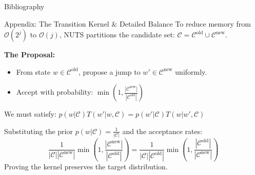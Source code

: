 \documentclass{beamer}
\begin{document}
\begin{frame}{Bibliography}
    \printbibliography[heading=none]
\end{frame}
\endgroup

\appendix

\begin{frame}{Appendix: The Transition Kernel \& Detailed Balance}
    To reduce memory from $\mathcal{O}(2^j)$ to $\mathcal{O}(j)$, NUTS partitions the candidate set: $\mathcal{C} = \mathcal{C}^{\text{old}} \cup \mathcal{C}^{\text{new}}$.

    \vspace{0.03cm}
    \textbf{The Proposal:}
    \begin{itemize}
        \item From state $w \in \mathcal{C}^{\text{old}}$, propose a jump to $w' \in \mathcal{C}^{\text{new}}$ uniformly.
        \item Accept with probability: $\min\left(1, \frac{|\mathcal{C}^{\text{new}}|}{|\mathcal{C}^{\text{old}}|}\right)$
    \end{itemize}

    \vspace{0.03cm}
    \begin{tcolorbox}[colback=CSlight, colframe=CSgrey, title=Proof of Detailed Balance (Intuition)]
        We must satisfy: $p(w|\mathcal{C})T(w'|w, \mathcal{C}) = p(w'|\mathcal{C})T(w|w', \mathcal{C})$
        
        \vspace{0.05cm}
        Substituting the prior $p(w|\mathcal{C}) = \frac{1}{|\mathcal{C}|}$ and the acceptance rates:
        $$ \frac{1}{|\mathcal{C}||\mathcal{C}^{\text{new}}|} \min\left(1, \frac{|\mathcal{C}^{\text{new}}|}{|\mathcal{C}^{\text{old}}|}\right) = \frac{1}{|\mathcal{C}||\mathcal{C}^{\text{old}}|} \min\left(1, \frac{|\mathcal{C}^{\text{old}}|}{|\mathcal{C}^{\text{new}}|}\right) $$
        Proving the kernel preserves the target distribution.
    \end{tcolorbox}
\end{frame}
\end{document}
